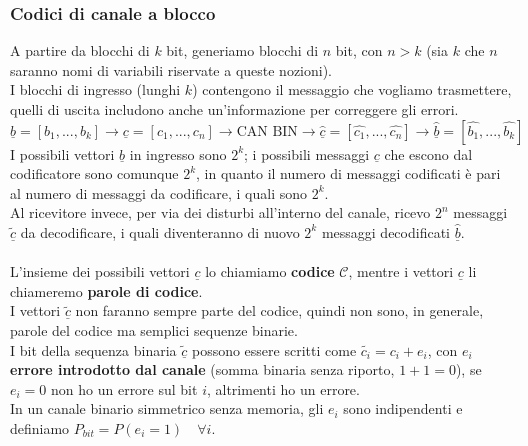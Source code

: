 \documentclass{article}
\begin{document}
\subsubsection{Codici di canale a blocco}
A partire da blocchi di $k$ bit, generiamo blocchi di $n$ bit, con $n>k$ (sia $k$ che $n$ saranno nomi di variabili riservate a queste nozioni).\\
I blocchi di ingresso (lunghi $k$) contengono il messaggio che vogliamo trasmettere, quelli di uscita includono anche un'informazione per correggere gli errori.\\
$$\underline{b}=[b_1,...,b_k]\rightarrow\underline{c}=[c_1,...,c_n]\rightarrow\mbox{CAN BIN}\rightarrow\underline{\hat{c}}=[\hat{c_1},...,\hat{c_n}]\rightarrow\underline{\hat{b}}=[\hat{b_1},...,\hat{b_k}]$$
I possibili vettori $\underline{b}$ in ingresso sono $2^k$; i possibili messaggi $\underline{c}$ che escono dal codificatore sono comunque $2^k$, in quanto il numero di messaggi codificati è pari al numero di messaggi da codificare, i quali sono $2^k$.\\
Al ricevitore invece, per via dei disturbi all'interno del canale, ricevo $2^n$ messaggi $\underline{\widetilde{c}}$ da decodificare, i quali diventeranno di nuovo $2^k$ messaggi decodificati $\hat{\underline{b}}$.\\\\
L'insieme dei possibili vettori $\underline{c}$ lo chiamiamo \textbf{codice} $\mathcal{C}$, mentre i vettori $\underline{c}$ li chiameremo \textbf{parole di codice}.\\
I vettori $\underline{\widetilde{c}}$ non faranno sempre parte del codice, quindi non sono, in generale, parole del codice ma semplici sequenze binarie.\\
I bit della sequenza binaria $\underline{\widetilde{c}}$ possono essere scritti come $\widetilde{c_i}=c_i+e_i$, con $e_i$ \textbf{errore introdotto dal canale} (somma binaria senza riporto, $1+1=0$), se $e_i=0$ non ho un errore sul bit $i$, altrimenti ho un errore.\\
In un canale binario simmetrico senza memoria, gli $e_i$ sono indipendenti e definiamo $P_{bit}=P(e_i=1)\quad\forall i$.
\end{document}
